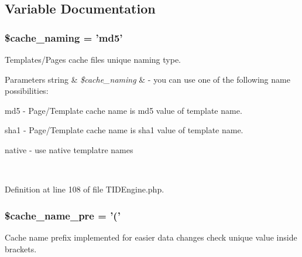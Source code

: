 \subsection{Variable Documentation}
\hypertarget{group__general__cache__settings_gad3689303b91750b4f90511e1ab46a75c}{
\subsubsection[{\$cache\_\-naming}]{\setlength{\rightskip}{0pt plus 5cm}\$cache\_\-naming = 'md5'}}
\label{group__general__cache__settings_gad3689303b91750b4f90511e1ab46a75c}
Templates/Pages cache files unique naming type.


\begin{DoxyParams}[1]{Parameters}
string & {\em \$cache\_\-naming} & -\/ you can use one of the following name possibilities:
\begin{DoxyItemize}
\item md5 -\/ Page/Template cache name is md5 value of template name.
\item sha1 -\/ Page/Template cache name is sha1 value of template name.
\item native -\/ use native templatre names 
\end{DoxyItemize}\\
\hline
\end{DoxyParams}


Definition at line 108 of file TIDEngine.php.

\hypertarget{group__general__cache__settings_gac05f99a6b3c71f3e31e77d5c9ea5914d}{
\subsubsection[{\$cache\_\-name\_\-pre}]{\setlength{\rightskip}{0pt plus 5cm}\$cache\_\-name\_\-pre = '('}}
\label{group__general__cache__settings_gac05f99a6b3c71f3e31e77d5c9ea5914d}
Cache name prefix implemented for easier data changes check unique value inside brackets.


